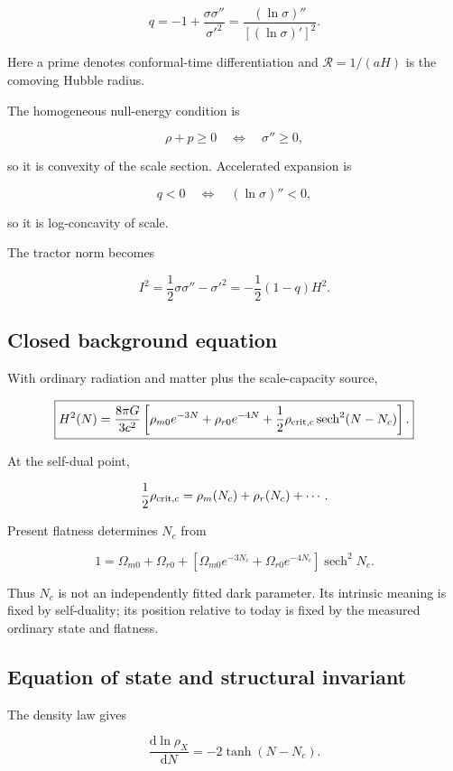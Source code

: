\documentclass[
  11pt,
  letterpaper,
]{article}
\begin{document}
\[
\boxed{
q=-1+\frac{\sigma\sigma''}{\sigma'^2}
=\frac{(\ln\sigma)''}{[(\ln\sigma)']^2}.
}
\]

Here a prime denotes conformal-time differentiation and
\(\mathcal R=1/(aH)\) is the comoving Hubble radius.

The homogeneous null-energy condition is

\[
\rho+p\ge0
\quad\Longleftrightarrow\quad
\sigma''\ge0,
\]

so it is convexity of the scale section. Accelerated expansion is

\[
q<0
\quad\Longleftrightarrow\quad
(\ln\sigma)''<0,
\]

so it is log-concavity of scale.

The tractor norm becomes

\[
\boxed{
I^2=\frac12\sigma\sigma''-\sigma'^2
=-\frac12(1-q)H^2.
}
\]

\subsection{Closed background
equation}\label{closed-background-equation}

With ordinary radiation and matter plus the scale-capacity source,

\[
\boxed{
H^2(N)=\frac{8\pi G}{3c^2}
\left[
\rho_{m0}e^{-3N}
+\rho_{r0}e^{-4N}
+\frac12\rho_{\rm crit,c}\operatorname{sech}^2(N-N_c)
\right].
}
\]

At the self-dual point,

\[
\frac12\rho_{\rm crit,c}
=\rho_m(N_c)+\rho_r(N_c)+\cdots.
\]

Present flatness determines \(N_c\) from

\[
\boxed{
1=\Omega_{m0}+\Omega_{r0}
+\left[
\Omega_{m0}e^{-3N_c}
+\Omega_{r0}e^{-4N_c}
\right]\operatorname{sech}^2N_c.
}
\]

Thus \(N_c\) is not an independently fitted dark parameter. Its
intrinsic meaning is fixed by self-duality; its position relative to
today is fixed by the measured ordinary state and flatness.

\subsection{Equation of state and structural
invariant}\label{equation-of-state-and-structural-invariant}

The density law gives

\[
\frac{\mathrm d\ln\rho_X}{\mathrm dN}
=-2\tanh(N-N_c).
\]
\end{document}
